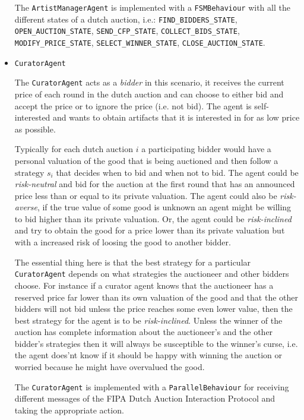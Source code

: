 \documentclass[a4paper, 11pt]{article}
\begin{document}
\begin{itemize}
The \texttt{ArtistManagerAgent} is implemented with a \texttt{FSMBehaviour} with all the different states of a dutch auction, i.e.: \texttt{FIND\_BIDDERS\_STATE}, \texttt{OPEN\_AUCTION\_STATE}, \texttt{SEND\_CFP\_STATE}, \texttt{COLLECT\_BIDS\_STATE}, \texttt{MODIFY\_PRICE\_STATE}, \texttt{SELECT\_WINNER\_STATE}, \texttt{CLOSE\_AUCTION\_STATE}.

\item \texttt{CuratorAgent}

The \texttt{CuratorAgent} acts as a \textit{bidder} in this scenario, it receives the current price of each round in the dutch auction and can choose to either bid and accept the price or to ignore the price (i.e. not bid). The agent is self-interested and wants to obtain artifacts that it is interested in for as low price as possible. 

Typically for each dutch auction $i$ a participating bidder would have a personal valuation of the good that is being auctioned and then follow a $\text{strategy }s_i$ that decides when to bid and when not to bid. The agent could be \textit{risk-neutral} and bid for the auction at the first round that has an announced price less than or equal to its private valuation. The agent could also be \textit{risk-averse}, if the true value of some good is unknown an agent might be willing to bid higher than its private valuation. Or, the agent could be \textit{risk-inclined} and try to obtain the good for a price lower than its private valuation but with a increased risk of loosing the good to another bidder. 

The essential thing here is that the best strategy for a particular \texttt{CuratorAgent} depends on what strategies the auctioneer and other bidders choose. For instance if a curator agent knows that the auctioneer has a reserved price far lower than its own valuation of the good and that the other bidders will not bid unless the price reaches some even lower value, then the best strategy for the agent is to be \textit{risk-inclined}. Unless the winner of the auction has complete information about the auctioneer's and the other bidder's strategies then it will always be susceptible to the winner's curse, i.e. the agent does'nt know if it should be happy with winning the auction or worried because he might have overvalued the good.

The \texttt{CuratorAgent} is implemented with a \texttt{ParallelBehaviour} for receiving different messages of the FIPA Dutch Auction Interaction Protocol and taking the appropriate action.

\end{itemize}
\end{document}
